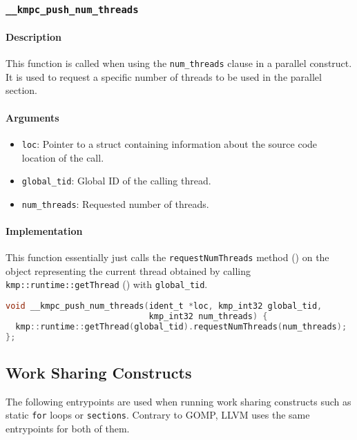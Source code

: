 \subsubsection{\texttt{\_\_kmpc\_push\_num\_threads}}
\label{subsubsec:kmpc-push-num-threads}

\paragraph{Description} This function is called when using the \texttt{num\_threads} clause in a
parallel construct. It is used to request a specific number of threads to be used in the parallel
section.

\paragraph{Arguments}
\begin{itemize}
	\item \texttt{loc}: Pointer to a struct containing information about the source code location
	      of the call.
	\item \texttt{global\_tid}: Global ID of the calling thread.
	\item \texttt{num\_threads}: Requested number of threads.
\end{itemize}

\paragraph{Implementation} This function essentially just calls the \texttt{requestNumThreads}
method () on the object representing the current thread obtained by calling
\texttt{kmp::runtime::getThread} () with \texttt{global\_tid}.

\begin{lstlisting}[language=C, caption={\_\_kmpc\_push\_num\_threads}, label={lst:push-num-threads},
                   escapechar=@]
void __kmpc_push_num_threads(ident_t *loc, kmp_int32 global_tid,
                             kmp_int32 num_threads) {
  kmp::runtime::getThread(global_tid).requestNumThreads(num_threads);
};
\end{lstlisting}

\subsection{Work Sharing Constructs}

The following entrypoints are used when running work sharing constructs such as static \texttt{for}
loops or \texttt{sections}. Contrary to GOMP, LLVM uses the same entrypoints for both of them.

